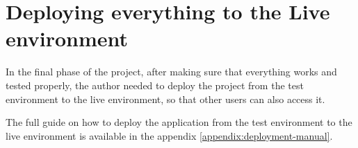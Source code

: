 







\section{Deploying everything to the Live environment}

In the final phase of the project, after making sure that everything works and tested properly, the author needed to deploy the project
from the test environment to the live environment, so that other users can also access it.

The full guide on how to deploy the application from the test environment to the live environment is available in the appendix
\ref{appendix:deployment-manual}.


